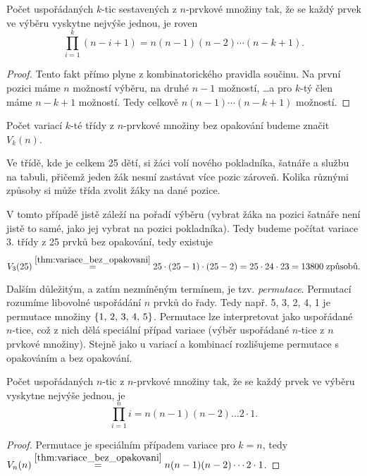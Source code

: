 \begin{theorem}\label{thm:variace_bez_opakovani}
    Počet uspořádaných $k$-tic sestavených z $n$-prvkové množiny tak, že se každý prvek ve výběru vyskytne nejvýše jednou, je roven
    \begin{equation*}
        \prod_{i=1}^{k}(n-i+1)=n(n-1)(n-2)\cdots(n-k+1).
    \end{equation*}
\end{theorem}
\begin{proof}
    Tento fakt přímo plyne z kombinatorického pravidla součinu. Na první pozici máme $n$ možností výběru, na druhé $n-1$ možností, \dots a pro $k$-tý člen máme $n-k+1$ možností. Tedy celkově $n(n-1)\cdots(n-k+1)$ možností.
\end{proof}

Počet variací $k$-té třídy z $n$-prvkové množiny bez opakování budeme značit $V_k(n)$.

\begin{exercise}
    Ve třídě, kde je celkem 25 dětí, si žáci volí nového pokladníka, šatnáře a službu na tabuli, přičemž jeden žák nesmí zastávat více pozic zároveň. Kolika různými způsoby si může třída zvolit žáky na dané pozice.
\end{exercise}
\begin{solution}
    V tomto případě jistě záleží na pořadí výběru (vybrat žáka na pozici šatnáře není jistě to samé, jako jej vybrat na pozici pokladníka). Tedy budeme počítat variace 3. třídy z 25 prvků bez opakování, tedy existuje
    \begin{equation*}
        V_3(25)\stackrel{\ref{thm:variace_bez_opakovani}}{=}25\cdot(25-1)\cdot(25-2)=25\cdot 24\cdot 23=13 800\;\text{způsobů.}
    \end{equation*}
\end{solution}

Dalším důležitým, a zatím nezmíněným termínem, je tzv. \emph{permutace}. Permutací rozumíme libovolné uspořádání $n$ prvků do řady. Tedy např. 5, 3, 2, 4, 1 je permutace množiny $\left\{1,\,2,\,3,\,4,\,5\right\}$. Permutace lze interpretovat jako uspořádané $n$-tice, což z nich dělá speciální případ variace (výběr uspořádané $n$-tice z $n$ prvkové množiny). Stejně jako u variací a kombinací rozlišujeme permutace s opakováním a bez opakování.
\begin{theorem}
    Počet uspořádaných $n$-tic z $n$-prvkové množiny tak, že se každý prvek ve výběru vyskytne nejvýše jednou, je
    \begin{equation*}
        \prod_{i=1}^{n}i=n(n-1)(n-2)\dots 2\cdot 1.
    \end{equation*}
\end{theorem}
\begin{proof}
    Permutace je speciálním případem variace pro $k=n$, tedy $V_n(n)\stackrel{\ref{thm:variace_bez_opakovani}}{=}n(n-1)(n-2)\cdots 2\cdot 1$.
\end{proof}

